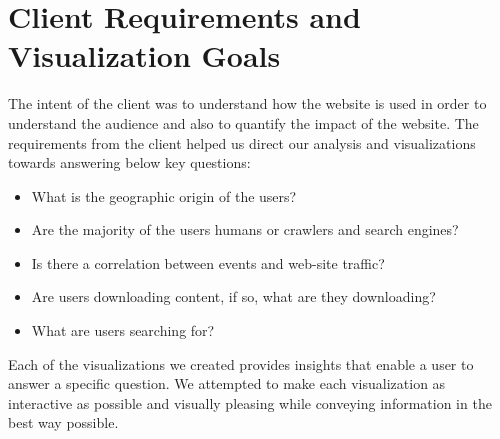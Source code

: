 \section{Client Requirements and Visualization Goals} \label{requirements}
 The intent of the client was to understand how the website is used in order to understand the audience and also to quantify the impact of the website. The requirements from the client helped us direct our analysis and visualizations towards answering below key questions:
\begin{itemize}
 \item What is the geographic origin of the users? \item Are the majority of the users humans or crawlers and search engines?
 \item Is there a correlation between events and web-site traffic?
 \item Are users downloading content, if so, what are they downloading?
 \item What are users searching for? 
 \end{itemize}
Each of the visualizations we created provides insights that enable a user to answer a specific question. We attempted to make each visualization as interactive as possible and visually pleasing while conveying information in the best way possible.
